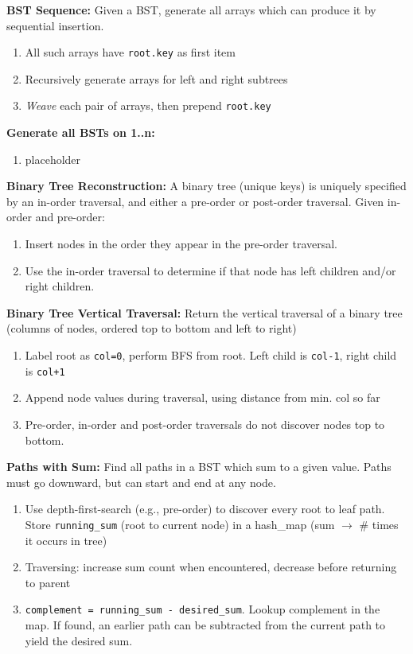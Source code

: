 \documentclass[12pt]{article}
\begin{document}
\vspace{5mm}
\noindent
\textbf{BST Sequence:}
Given a BST, generate all arrays which can produce it by sequential insertion.
\begin{enumerate}
\item All such arrays have \texttt{root.key} as first item
\item Recursively generate arrays for left and right subtrees
\item \emph{Weave} each pair of arrays, then prepend \texttt{root.key}
\end{enumerate}


\vspace{5mm}
\noindent
\textbf{Generate all BSTs on 1..n:}
\begin{enumerate}
\item placeholder
\end{enumerate}


\vspace{5mm}
\noindent
\textbf{Binary Tree Reconstruction:}
A binary tree (unique keys) is uniquely specified by an in-order traversal, 
and either a pre-order or post-order traversal. Given in-order and pre-order:
\begin{enumerate}
\item Insert nodes in the order they appear in the pre-order traversal.
\item Use the in-order traversal to determine if that node has left children and/or right children.
\end{enumerate}


\vspace{5mm}
\noindent
\textbf{Binary Tree Vertical Traversal:}
Return the vertical traversal of a binary tree (columns of nodes, ordered top to bottom and left to right)
\begin{enumerate}
\item Label root as \texttt{col=0}, perform BFS from root. Left child is \texttt{col-1}, 
right child is \texttt{col+1} 
\item Append node values during traversal, using distance from min. col so far
\item Pre-order, in-order and post-order traversals do not discover nodes top to bottom.
\end{enumerate}


\vspace{5mm}
\noindent
\textbf{Paths with Sum:}
Find all paths in a BST which sum to a given value. Paths must go downward, but can start and end at any node.
\begin{enumerate}
\item Use depth-first-search (e.g., pre-order) to discover every root to leaf path. Store 
\texttt{running\_sum} (root to current node) in a hash\_map (sum $\rightarrow$ \# times it occurs in tree)
\item Traversing: increase sum count when encountered, decrease before returning to parent
\item \texttt{complement = running\_sum - desired\_sum}. Lookup complement in the map.
If found, an earlier path can be subtracted from the current path to yield the desired sum.
\end{enumerate}
\end{document}
